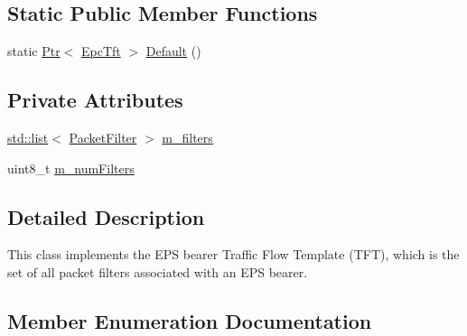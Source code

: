 \subsection*{Static Public Member Functions}
\begin{DoxyCompactItemize}
\item 
static \hyperlink{classns3_1_1Ptr}{Ptr}$<$ \hyperlink{classns3_1_1EpcTft}{Epc\+Tft} $>$ \hyperlink{classns3_1_1EpcTft_a48c099da249ba99152c2e597c864e155}{Default} ()
\end{DoxyCompactItemize}
\subsection*{Private Attributes}
\begin{DoxyCompactItemize}
\item 
\hyperlink{openflow-interface_8h_afd9bcfa176617760671b67580f536fa7}{std\+::list}$<$ \hyperlink{structns3_1_1EpcTft_1_1PacketFilter}{Packet\+Filter} $>$ \hyperlink{classns3_1_1EpcTft_a7310a580f93a164bba5e78563fcbf1e3}{m\+\_\+filters}
\item 
uint8\+\_\+t \hyperlink{classns3_1_1EpcTft_a86b3c690c3503dff761f01d5edc501e1}{m\+\_\+num\+Filters}
\end{DoxyCompactItemize}


\subsection{Detailed Description}
This class implements the E\+PS bearer Traffic Flow Template (T\+FT), which is the set of all packet filters associated with an E\+PS bearer. 

\subsection{Member Enumeration Documentation}
